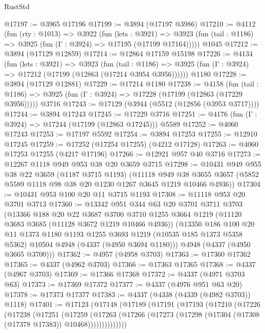 \begin{lexlean}{RustStd}
\begin{coremodule}
@17197 := @3965 @17196
@17199 := @3894 (@17197 @3986)
@17210 := @4112
    (fun (rty : @1013) =>
    @3922
      (fun (lets : @3921) =>
      @3923 (fun (tail : @1186) => @3925 (fun (Γ : @3924) => @17195 (@17199 @17164)))))
    @1045
@17212 := @3894 (@17129 @12859)
@17214 := @12864 @17159 @15198
@17226 := @4134
    (fun (lets : @3921) =>
    @3923
      (fun (tail : @1186) =>
      @3925 (fun (Γ : @3924) => @17212 (@17199 (@12863 (@17214 @3954 @3956))))))
    @1180
@17228 := @3894 (@17129 @12881)
@17229 := @17214 @1180
@17238 := @4158
    (fun (tail : @1186) => @3925 (fun (Γ : @3924) => @17228 (@17199 (@12863 (@17229 @3956)))))
    @3716
@17243 := @17129 (@3944 (@5512 (@12856 (@3953 @3717))))
@17244 := @3894 @17243
@17245 := @17229 @3716
@17251 := @4176 (fun (Γ : @3924) => @17244 (@17199 (@12863 @17245))) @5589
@17252 := @4060 @17243
@17253 := @17197 @5592
@17254 := @3894 @17253
@17255 := @12910 @17245
@17259 := @17252 (@17254 @17255) (@4212 @17128)
@17263 := @4060 @17253 @17255 (@4217 @17196)
@17266 := @12921 @957 @40 @3716
@17273 := @12267 @1118 @949 @953 @38 @20 @3659 @3715
@17298 := @10431
    @949
    @955
    @38
    @22
    @3659
    (@1187 @3715 @1193)
    (@11118
      @949
      @38
      @3655
      @3657
      (@5852 @5589 @1118 @98 @38 @20 @1230 @1267 @3645 @1219 @10466 @4936))
@17304 := @10431 @953 @100 @20 @11 @3715 @1193
@17308 := @11118 @953 @20 @3701 @3713
@17360 := @13342
    @951
    @344
    @63
    @20
    @3701
    @3711
    @3703
    (@13366
      @188
      @20
      @22
      @3687
      @3700
      @3710
      @1255
      @3664
      @1219
      (@11120 @3683 @3685 (@11128 @3672 @1219 @10466 @4936))
      (@13350
        @186
        @100
        @20
        @11
        @1373
        @1180
        @1193
        @1255
        @3693
        @1219
        (@10535 @185 @1373 @5358 @5362)
        @10504
        @4948
        (@4337 (@4950 @3694 @1180)))
      @4948
      (@4337 (@4950 @3665 @3700)))
@17362 := @4957 (@4958 @3703)
@17363 := @17360 @17362
@17365 := @4337 (@4962 @3703)
@17366 := @17363 @17365
@17368 := @4337 (@4967 @3703)
@17369 := @17366 @17368
@17372 := @4337 (@4971 @3703 @63)
@17373 := @17369 @17372
@17377 := @4337 (@4976 @951 @63 @20)
@17378 := @17373 @17377
@17383 := @4337 (@4338 (@4339 (@4982 @3703)) @1118)
@17401 := @17123
    (@17148
      (@17189
        (@17191
          (@17193
            (@17210
              (@17226
                (@17238
                  (@17251
                    (@17259
                      (@17263
                        (@17266
                          (@17273 (@17298 (@17304 (@17308 (@17378 @17383)) @10468))))))))))))))

\end{coremodule}
\end{lexlean}
